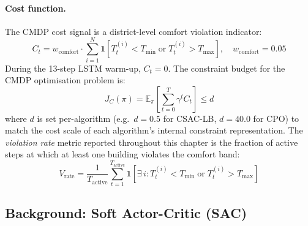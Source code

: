 \paragraph{Cost function.}
The CMDP cost signal is a district-level comfort violation indicator:
\begin{equation}
  C_t = w_{\text{comfort}} \cdot \sum_{i=1}^{N} \mathbf{1}\!\left[
    T_t^{(i)} < T_{\min} \;\text{or}\; T_t^{(i)} > T_{\max}
  \right], \quad w_{\text{comfort}} = 0.05
  \label{eq:cmdp-cost}
\end{equation}
During the 13-step LSTM warm-up, $C_t = 0$.  The constraint budget for the
CMDP optimisation problem is:
\begin{equation}
  J_C(\pi) = \mathbb{E}_\pi\!\left[\sum_{t=0}^{T} \gamma^t C_t\right] \leq d
  \label{eq:cmdp-budget}
\end{equation}
where $d$ is set per-algorithm (e.g.\ $d = 0.5$ for CSAC-LB, $d = 40.0$ for
CPO) to match the cost scale of each algorithm's internal constraint
representation.  The \emph{violation rate} metric reported throughout this
chapter is the fraction of active steps at which at least one building violates
the comfort band:
\begin{equation}
  V_{\text{rate}} = \frac{1}{T_{\text{active}}}
    \sum_{t=1}^{T_{\text{active}}} \mathbf{1}\!\left[
      \exists\, i : T_t^{(i)} < T_{\min}
      \;\text{or}\; T_t^{(i)} > T_{\max}
    \right]
  \label{eq:violation-rate}
\end{equation}


\subsection{Background: Soft Actor-Critic (SAC)}
\label{sec:temp-sac-background}

